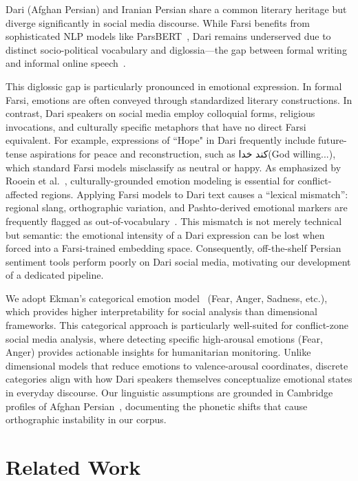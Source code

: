 \documentclass[runningheads]{llncs}
\newcommand{\textfarsi}[1]{{\foreignlanguage{arabic}{#1}}\xspace}
\begin{document}
Dari (Afghan Persian) and Iranian Persian share a common literary heritage 
but diverge significantly in social media discourse. While Farsi benefits from 
sophisticated NLP models like ParsBERT~\cite{farahani2021parsbert}, Dari remains 
underserved due to distinct socio-political vocabulary and diglossia---the gap 
between formal writing and informal online speech~\cite{mahmoodi2018spoken}. 

This diglossic gap is particularly pronounced in emotional expression. 
In formal Farsi, emotions are often conveyed through standardized literary 
constructions. In contrast, Dari speakers on social media employ colloquial 
forms, religious invocations, and culturally specific metaphors that have no 
direct Farsi equivalent. For example, expressions of ``Hope" in Dari frequently 
include future-tense aspirations for peace and reconstruction, such as 
\textfarsi{کند خدا}(God willing...), 
which standard Farsi models misclassify as neutral or happy.
As emphasized by Rooein et al.~\cite{rooein2025culturally}, culturally-grounded 
emotion modeling is essential for conflict-affected regions.
Applying Farsi models to Dari text causes a ``lexical mismatch'': regional slang, 
orthographic variation, and Pashto-derived emotional markers are frequently 
flagged as out-of-vocabulary~\cite{hussiny2024persianemo}. 
This mismatch is not merely technical but semantic: the emotional 
intensity of a Dari expression can be lost when forced into a Farsi-trained 
embedding space. Consequently, off-the-shelf Persian sentiment tools perform 
poorly on Dari social media, motivating our development of a dedicated pipeline.

We adopt Ekman's categorical emotion model~\cite{ekman1992} (Fear, Anger, Sadness, 
etc.), which provides higher interpretability for social analysis than 
dimensional frameworks. This categorical approach is particularly 
well-suited for conflict-zone social media analysis, where detecting specific 
high-arousal emotions (Fear, Anger) provides actionable insights for humanitarian 
monitoring. Unlike dimensional models that reduce emotions to valence-arousal 
coordinates, discrete categories align with how Dari speakers themselves 
conceptualize emotional states in everyday discourse.
Our linguistic assumptions are grounded in Cambridge profiles of Afghan Persian~\cite{baker2016dari}, documenting the phonetic shifts that cause orthographic instability in our corpus.

\section{Related Work}
\label{sec:rel_work}
\end{document}

